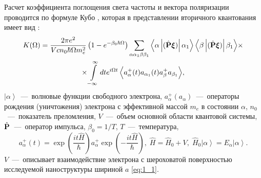 Расчет коэффициента поглощения света частоты   и вектора поляризации   проводится по формуле Кубо \cite{Kubo1957a}, которая в представлении вторичного квантования имеет вид \cite{Sinyavskii2010}:
\begin{multline} \label{eq:21_02}
K(\Omega) = \frac{2 \pi e^2}{V c n_0 \hbar \Omega m_e^2}\left( 1 - e^{-\beta_0 \hbar \Omega} \right) \sum_{\alpha \alpha_1 \beta \beta_1} {\left\langle \alpha \left| (\hat{\boldsymbol{\mathbf{P}}} \boldsymbol{\mathbf{\xi}})  \right| \alpha_1 \right\rangle \left\langle \beta \left| (\hat{\boldsymbol{\mathbf{P}}} \boldsymbol{\mathbf{\xi}})  \right| \beta_1 \right\rangle} \times\\
\times\int\limits_{-\infty }^{\infty} {dt e^{i\Omega t}\left\langle a_{\alpha }^+ (t) a_{\alpha_1 }(t) a_{\beta }^+ a_{\beta_1 } \right\rangle}  ,
\end{multline} 
${\left| \alpha  \right\rangle} $~---~волновые функции свободного электрона,   $a_{\alpha}^+ (a_{\alpha})$~---~операторы рождения (уничтожения) электрона с эффективной массой $m_e$ в состоянии $\alpha$,  $n_0$~---~показатель преломления, $V$~---~объем основной области квантовой системы,  $\hat{\boldsymbol{\mathbf{P}}}$~---~оператор импульса, $\beta_0 = 1 / T$,  $T$~---~температура,
\[
a_{\alpha }^+ (t)= \exp\left(\frac{it\hat{H}}{\hbar } \right)a_{\alpha }^+ \exp\left(-\frac{it\hat{H}}{\hbar } \right), \;
\hat{H} = \hat{H}_0 + V, \;
\hat{H}_0 {\left| \alpha  \right\rangle} = E_{\alpha} {\left| \alpha  \right\rangle}.
\]
$V$~---~описывает взаимодействие электрона с шероховатой поверхностью исследуемой наноструктуры шириной $a$ \eqref{eq:1_1}.

